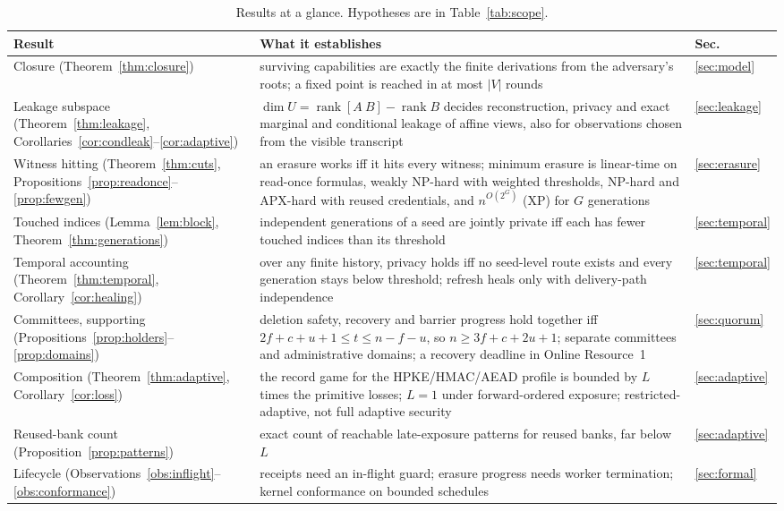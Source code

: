 \documentclass[pdflatex,sn-mathphys-num]{sn-jnl}%
\theoremstyle{plain}
\theoremstyle{definition}
\newcommand{\rk}{\operatorname{rank}}
\begin{document}
\begin{table}[htbp]
\caption{Results at a glance. Hypotheses are in Table~\ref{tab:scope}.}\label{tab:glance}
\centering\footnotesize
\begin{tabularx}{\linewidth}{@{}>{\raggedright\arraybackslash}p{.25\linewidth}Y>{\raggedright\arraybackslash}p{.07\linewidth}@{}}\toprule
Result & What it establishes & Sec.\\\midrule
Closure (Theorem~\ref{thm:closure}) & surviving capabilities are exactly the finite derivations from the adversary's roots; a fixed point is reached in at most $|V|$ rounds & \ref{sec:model}\\
Leakage subspace (Theorem~\ref{thm:leakage}, Corollaries~\ref{cor:condleak}--\ref{cor:adaptive}) & $\dim U=\rk[A\ B]-\rk B$ decides reconstruction, privacy and exact marginal and conditional leakage of affine views, also for observations chosen from the visible transcript & \ref{sec:leakage}\\
Witness hitting (Theorem~\ref{thm:cuts}, Propositions~\ref{prop:readonce}--\ref{prop:fewgen}) & an erasure works iff it hits every witness; minimum erasure is linear-time on read-once formulas, weakly NP-hard with weighted thresholds, NP-hard and APX-hard with reused credentials, and $n^{O(2^G)}$ (XP) for $G$ generations & \ref{sec:erasure}\\
Touched indices (Lemma~\ref{lem:block}, Theorem~\ref{thm:generations}) & independent generations of a seed are jointly private iff each has fewer touched indices than its threshold & \ref{sec:temporal}\\
Temporal accounting (Theorem~\ref{thm:temporal}, Corollary~\ref{cor:healing}) & over any finite history, privacy holds iff no seed-level route exists and every generation stays below threshold; refresh heals only with delivery-path independence & \ref{sec:temporal}\\
Committees, supporting (Propositions~\ref{prop:holders}--\ref{prop:domains}) & deletion safety, recovery and barrier progress hold together iff $2f+c+u+1\le t\le n-f-u$, so $n\ge3f+c+2u+1$; separate committees and administrative domains; a recovery deadline in Online Resource~1 & \ref{sec:quorum}\\
Composition (Theorem~\ref{thm:adaptive}, Corollary~\ref{cor:loss}) & the record game for the HPKE/HMAC/AEAD profile is bounded by $L$ times the primitive losses; $L=1$ under forward-ordered exposure; restricted-adaptive, not full adaptive security & \ref{sec:adaptive}\\
Reused-bank count (Proposition~\ref{prop:patterns}) & exact count of reachable late-exposure patterns for reused banks, far below $L$ & \ref{sec:adaptive}\\
Lifecycle (Observations~\ref{obs:inflight}--\ref{obs:conformance}) & receipts need an in-flight guard; erasure progress needs worker termination; kernel conformance on bounded schedules & \ref{sec:formal}\\\bottomrule
\end{tabularx}
\end{table}
\end{document}
